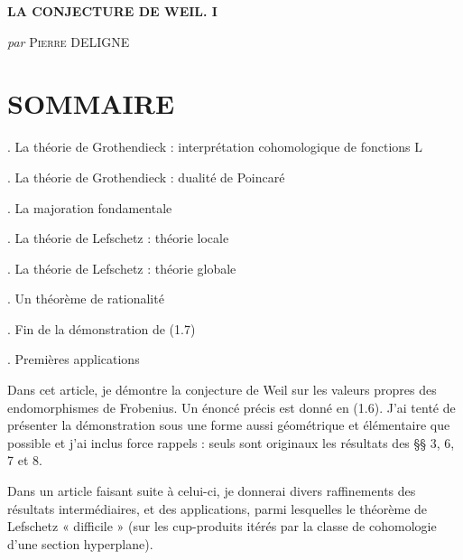 \documentclass[10pt,leqno]{article}
\begin{document}
\setcounter{page}{273}


\begin{center}{\Large\bfseries LA CONJECTURE DE WEIL. I}\par\medskip \emph{par} \textsc{Pierre} DELIGNE\end{center}

\label{physical-2}

\section*{SOMMAIRE}

. La théorie de Grothendieck : interprétation cohomologique de fonctions \(\mathrm{L}\)\par

. La théorie de Grothendieck : dualité de Poincaré\par

. La majoration fondamentale\par

. La théorie de Lefschetz : théorie locale\par

. La théorie de Lefschetz : théorie globale\par

. Un théorème de rationalité\par

. Fin de la démonstration de (1.7)\par

. Premières applications\par

\noindent Dans cet article, je démontre la conjecture de Weil sur les valeurs propres des endomorphismes de Frobenius. Un énoncé précis est donné en (1.6). J’ai tenté de présenter la démonstration sous une forme aussi géométrique et élémentaire que possible et j’ai inclus force rappels : seuls sont originaux les résultats des §§ 3, 6, 7 et 8.\par

\noindent Dans un article faisant suite à celui-ci, je donnerai divers raffinements des résultats intermédiaires, et des applications, parmi lesquelles le théorème de Lefschetz « difficile » (sur les cup-produits itérés par la classe de cohomologie d’une section hyperplane).\par
\end{document}

